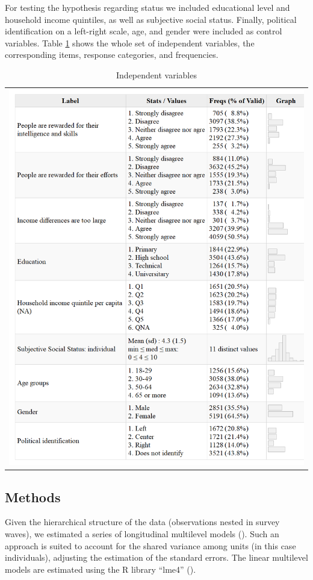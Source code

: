 \documentclass[
  12pt,
  a4paper,
]{article}
\begin{document}
For testing the hypothesis regarding status we included educational level and household income quintiles, as well as subjective social status. Finally, political identification on a left-right scale, age, and gender were included as control variables. Table \ref{tab:descriptives} shows the whole set of independent variables, the corresponding items, response categories, and frequencies.

\begin{longtable}[]{@{}l@{}}
\caption{\label{tab:descriptives}Independent variables}\tabularnewline
\toprule\noalign{}
\endfirsthead
\endhead
\bottomrule\noalign{}
\endlastfoot
\includegraphics{output/tables/desc02.png} \\
\end{longtable}

\subsection{Methods}\label{methods}

Given the hierarchical structure of the data (observations nested in survey waves), we estimated a series of longitudinal multilevel models (). Such an approach is suited to account for the shared variance among units (in this case individuals), adjusting the estimation of the standard errors. The linear multilevel models are estimated using the R library ``lme4'' ().
\end{document}
